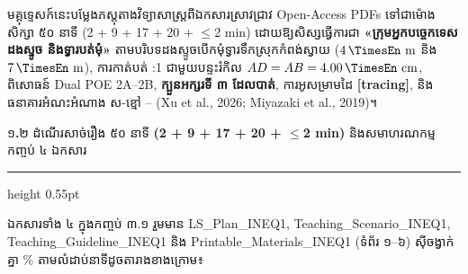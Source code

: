 \documentclass[a4paper,12pt]{article}
\newcommand{\en}[1]{{\TimesEn #1}}
\newcommand{\enbf}[1]{{\TimesEn\textbf{#1}}}
\newcommand{\unit}[1]{\,\text{\en{#1}}}
\newcommand{\cnum}[1]{{\TimesEn\fontsize{10.5pt}{12pt}\selectfont\ding{\numexpr181+#1\relax}}}
\newcommand{\subsectitle}[1]{{\muol\fontsize{11pt}{14.5pt}\selectfont #1}}
\newcommand{\subsec}[1]{%
  \Needspace{1.6cm}%
  \vspace{2pt}%
  \subsectitle{#1}\par%
  \vspace{-2pt}%
  {\color{black}\hrule height 0.55pt}%
  \vspace{2pt}%
}
\begin{document}
មគ្គុទ្ទេសក៍នេះបម្លែងភស្តុតាងវិទ្យាសាស្ត្រពីឯកសារស្រាវជ្រាវ \en{Open-Access PDFs} ទៅជាម៉ោងសិក្សា ៥០ នាទី \en{(2 + 9 + 17 + 20 + $\le$2 min)} ដោយឱ្យសិស្សធ្វើការជា \textbf{«ក្រុមអ្នកបច្ចេកទេសដងស្ទូច និងទ្វារបត់មុំ»} តាមបរិបទដងស្ទូចបើកមុំទ្វារទឹកស្រុកកំពង់ស្វាយ ($4\unit{m}$ និង $7\unit{m}$), ការកាត់បត់ \en{1:1} ជាមួយបន្ទះរំកិល $AD=AB=4.00\unit{cm}$, ពិសោធន៍ \en{Dual POE 2A--2B}, \textbf{ក្បួនអក្សរទី ៣ ដែលបាត់}, ការអូសម្រាមដៃ \en{\textbf{[tracing]}}, និងធនាគារអំណះអំណាង ស-ខ្មៅ \cnum{1}--\cnum{5} \en{(Xu et al., 2026; Miyazaki et al., 2019)}។

\subsec{១\enbf{.}២ ដំណើរសាច់រឿង ៥០ នាទី \enbf{(2 + 9 + 17 + 20 + $\le$2 min)} និងសមាហរណកម្មកញ្ចប់ ៤ ឯកសារ}

ឯកសារទាំង ៤ ក្នុងកញ្ចប់ ៣.១ រួមមាន \en{LS\_\allowbreak Plan\_\allowbreak INEQ1}, \en{Teaching\_\allowbreak Scenario\_\allowbreak INEQ1}, \en{Teaching\_\allowbreak Guideline\_\allowbreak INEQ1} និង \en{Printable\_\allowbreak Materials\_\allowbreak INEQ1} (ទំព័រ ១--៦) ស៊ីចង្វាក់គ្នា \en{100\%} តាមលំដាប់នាទីដូចតារាងខាងក្រោម៖
\end{document}
